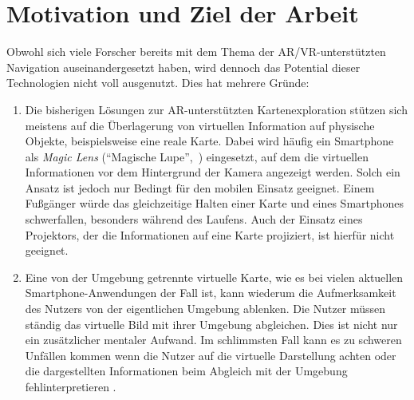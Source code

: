 \section{Motivation und Ziel der Arbeit}
\label{sec:motivation_ziel}
Obwohl sich viele Forscher bereits mit dem Thema der AR/VR-unterstützten Navigation auseinandergesetzt haben, wird dennoch das Potential dieser Technologien nicht voll ausgenutzt.
Dies hat mehrere Gründe:
\begin{enumerate}
\item Die bisherigen Lösungen zur AR-unterstützten Kartenexploration stützen sich meistens auf die Überlagerung von virtuellen Information auf physische Objekte, beispielsweise eine reale Karte.
Dabei wird häufig ein Smartphone als \emph{Magic Lens} (\enquote{Magische Lupe},~\cite{Bier1994}) eingesetzt, auf dem die virtuellen Informationen vor dem Hintergrund der Kamera angezeigt werden.
Solch ein Ansatz ist jedoch nur Bedingt für den mobilen Einsatz geeignet.
Einem Fußgänger würde das gleichzeitige Halten einer Karte und eines Smartphones schwerfallen, besonders während des Laufens.
Auch der Einsatz eines Projektors, der die Informationen auf eine Karte projiziert, ist hierfür nicht geeignet.

\item Eine von der Umgebung getrennte virtuelle Karte, wie es bei vielen aktuellen Smartphone-Anwendungen der Fall ist, kann wiederum die Aufmerksamkeit des Nutzers von der eigentlichen Umgebung ablenken.
Die Nutzer müssen ständig das virtuelle Bild mit ihrer Umgebung abgleichen.
Dies ist nicht nur ein zusätzlicher mentaler Aufwand.
Im schlimmsten Fall kann es zu schweren Unfällen kommen wenn die Nutzer auf die virtuelle Darstellung achten oder die dargestellten Informationen beim Abgleich mit der Umgebung fehlinterpretieren \parencites{Medenica2011}{Lin2017}.


\end{enumerate}
